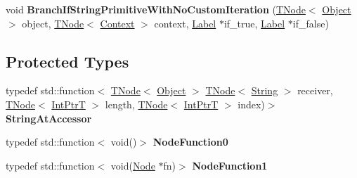 \begin{DoxyCompactItemize}
\item 
\mbox{\label{classv8_1_1internal_1_1StringBuiltinsAssembler_a5694b6ec6169b3c9eb72ae319533dc9d}} 
void {\bfseries Branch\+If\+String\+Primitive\+With\+No\+Custom\+Iteration} (\mbox{\hyperlink{classv8_1_1internal_1_1compiler_1_1TNode}{T\+Node}}$<$ \mbox{\hyperlink{classv8_1_1internal_1_1Object}{Object}} $>$ object, \mbox{\hyperlink{classv8_1_1internal_1_1compiler_1_1TNode}{T\+Node}}$<$ \mbox{\hyperlink{classv8_1_1internal_1_1Context}{Context}} $>$ context, \mbox{\hyperlink{classv8_1_1internal_1_1compiler_1_1CodeAssemblerLabel}{Label}} $\ast$if\+\_\+true, \mbox{\hyperlink{classv8_1_1internal_1_1compiler_1_1CodeAssemblerLabel}{Label}} $\ast$if\+\_\+false)
\end{DoxyCompactItemize}
\subsection*{Protected Types}
\begin{DoxyCompactItemize}
\item 
\mbox{\label{classv8_1_1internal_1_1StringBuiltinsAssembler_a9add15edfcabc1c76a57446e75b999ab}} 
typedef std\+::function$<$ \mbox{\hyperlink{classv8_1_1internal_1_1compiler_1_1TNode}{T\+Node}}$<$ \mbox{\hyperlink{classv8_1_1internal_1_1Object}{Object}} $>$ \mbox{\hyperlink{classv8_1_1internal_1_1compiler_1_1TNode}{T\+Node}}$<$ \mbox{\hyperlink{classv8_1_1internal_1_1String}{String}} $>$ receiver, \mbox{\hyperlink{classv8_1_1internal_1_1compiler_1_1TNode}{T\+Node}}$<$ \mbox{\hyperlink{structv8_1_1internal_1_1IntPtrT}{Int\+PtrT}} $>$ length, \mbox{\hyperlink{classv8_1_1internal_1_1compiler_1_1TNode}{T\+Node}}$<$ \mbox{\hyperlink{structv8_1_1internal_1_1IntPtrT}{Int\+PtrT}} $>$ index)$>$ {\bfseries String\+At\+Accessor}
\item 
\mbox{\label{classv8_1_1internal_1_1StringBuiltinsAssembler_a259db4fd59361900a596d4506dc77fe0}} 
typedef std\+::function$<$ void()$>$ {\bfseries Node\+Function0}
\item 
\mbox{\label{classv8_1_1internal_1_1StringBuiltinsAssembler_a495f40d73ca92920770607bd1aaca6b3}} 
typedef std\+::function$<$ void(\mbox{\hyperlink{classv8_1_1internal_1_1compiler_1_1Node}{Node}} $\ast$fn)$>$ {\bfseries Node\+Function1}
\end{DoxyCompactItemize}
